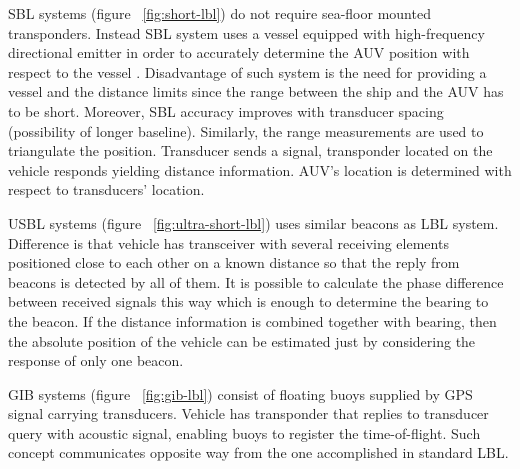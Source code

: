 SBL systems (figure ~\ref{fig:short-lbl}) do not require sea-floor mounted transponders. Instead SBL system uses a vessel equipped with high-frequency directional emitter in order to accurately determine the AUV position with respect to the vessel \cite{maurelli08}. Disadvantage of such system is the need for providing a vessel and the distance limits since the range between the ship and the AUV has to be short. Moreover, SBL accuracy improves with transducer spacing (possibility of longer baseline). Similarly, the range measurements are used to triangulate the position. Transducer sends a signal, transponder located on the vehicle responds yielding distance information. AUV's location is determined with respect to transducers' location.

USBL systems (figure ~\ref{fig:ultra-short-lbl}) uses similar beacons as LBL system. Difference is that vehicle has transceiver with several receiving elements positioned close to each other on a known distance so that the reply from beacons is detected by all of them. It is possible to calculate the phase difference between received signals this way which is enough to determine the bearing to the beacon. If the distance information is combined together with bearing, then the absolute position of the vehicle can be estimated just by considering the response of only one beacon. 

GIB systems (figure ~\ref{fig:gib-lbl}) consist of floating buoys supplied by GPS signal carrying transducers. Vehicle has transponder that replies to transducer query with acoustic signal, enabling buoys to register the time-of-flight. Such concept communicates opposite way from the one accomplished in standard LBL.    

